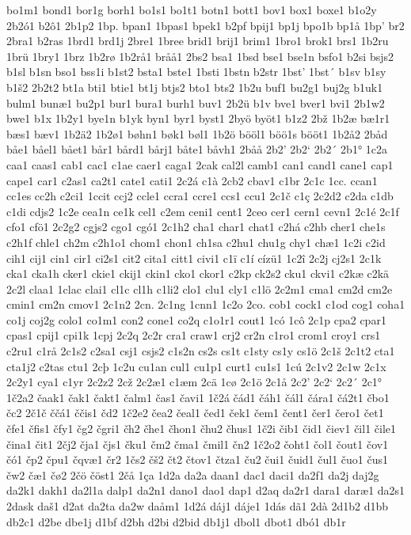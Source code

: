 bo1m1
bond1
bor1g
borh1
bo1s1
bo1t1
botn1
bott1
bov1
box1
boxe1
b1o2y
2b2ó1
b2ô1
2b1p2
1bp.
bpan1
1bpas1
bpek1
b2pf
bpij1
bp1j
bpo1b
bp1å
1bp'
br2
2bra1
b2ras
1brd1
brd1j
2bre1
1bree
brid1
brij1
brim1
1bro1
brok1
brs1
1b2ru
1brü
1bry1
1brz
1b2rø
1b2rå1
bråå1
2bs2
bsa1
1bsd
bse1
bse1n
bsfo1
b2si
bsjs2
b1sl
b1sn
bso1
bss1i
b1st2
bsta1
bste1
1bsti
1bstn
b2str
1bst'
1bst´
b1sv
b1sy
b1š2
2b2t2
bt1a
bti1
btie1
bt1j
btjs2
bto1
bts2
1b2u
buf1
bu2g1
buj2g
b1uk1
bulm1
bunæ1
bu2p1
bur1
bura1
burh1
buv1
2b2ü
b1v
bve1
bver1
bvi1
2b1w2
bwe1
b1x
1b2y1
bye1n
b1yk
byn1
byr1
byst1
2byö
byöt1
b1z2
2bž
1b2æ
bæ1r1
bæs1
bæv1
1b2ä2
1b2ø1
bøhn1
bøk1
bøl1
1b2ö
bööl1
böö1s
bööt1
1b2å2
2båd
båe1
båel1
bået1
bår1
bård1
bårj1
båte1
båvh1
2båå
2b2'
2b2`
2b2´
2b1°
1c2a
caa1
caas1
cab1
cac1
c1ae
caer1
caga1
2cak
cal2l
camb1
can1
cand1
cane1
cap1
cape1
car1
c2as1
ca2t1
cate1
cati1
2c2á
c1à
2cb2
cbav1
c1br
2c1c
1cc.
ccan1
cc1es
cc2h
c2ci1
1ccit
ccj2
ccle1
ccra1
ccre1
ccs1
ccu1
2c1č
c1ç
2c2d2
c2da
c1db
c1di
cdjs2
1c2e
cea1n
ce1k
cel1
c2em
ceni1
cent1
2ceo
cer1
cern1
cevn1
2c1é
2c1f
cfo1
cfö1
2c2g2
cgjs2
cgo1
cgó1
2c1h2
cha1
char1
chat1
c2há
c2hb
cher1
che1s
c2h1f
chle1
ch2m
c2h1o1
chom1
chon1
ch1sa
c2hu1
chu1g
chy1
chæ1
1c2i
c2id
cih1
cij1
cin1
cir1
ci2s1
cit2
cita1
citt1
civi1
c1ï
c1í
cízü1
1c2î
2c2j
cj2s1
2c1k
cka1
cka1h
cker1
ckie1
ckij1
ckin1
cko1
ckor1
c2kp
ck2s2
cku1
ckvi1
c2kæ
c2kä
2c2l
claa1
1clac
clai1
cl1c
cl1h
c1li2
clo1
clu1
cly1
c1lö
2c2m1
cma1
cm2d
cm2e
cmin1
cm2n
cmov1
2c1n2
2cn.
2c1ng
1cnn1
1c2o
2co.
cob1
cock1
c1od
cog1
coha1
co1j
coj2g
colo1
co1m1
con2
cone1
co2q
c1o1r1
cout1
1có
1cô
2c1p
cpa2
cpar1
cpas1
cpij1
cpi1k
1cpj
2c2q
2c2r
cra1
craw1
crj2
cr2n
c1ro1
crom1
croy1
crs1
c2ru1
c1rå
2c1s2
c2sa1
csj1
csjs2
c1s2n
cs2s
cs1t
c1sty
cs1y
cs1ö
2c1š
2c1t2
cta1
cta1j2
c2tas
ctu1
2cþ
1c2u
cu1an
cul1
cu1p1
curt1
cu1s1
1cú
2c1v2
2c1w
2c1x
2c2y1
cya1
c1yr
2c2z2
2cž
2c2æ1
c1æm
2cä
1cø
2c1ö
2c1å
2c2'
2c2`
2c2´
2c1°
1č2a2
čaak1
čak1
čakt1
čalm1
čas1
čavi1
1č2á
čád1
čáh1
čál1
čára1
čá2t1
čbo1
čc2
2č1č
ččá1
ččis1
čd2
1č2e2
čea2
čeal1
čed1
ček1
čem1
čent1
čer1
čero1
čet1
čfe1
čfis1
čfy1
čg2
čgri1
čh2
čhe1
čhon1
čhu2
čhus1
1č2i
čib1
čid1
čiev1
čil1
čile1
čina1
čit1
2čj2
čja1
čjs1
čku1
čm2
čma1
čmil1
čn2
1č2o2
čoht1
čol1
čout1
čov1
čó1
čp2
čpu1
čqvæ1
čr2
1čs2
čš2
čt2
čtov1
čtza1
ču2
čui1
čuid1
čul1
čuo1
čus1
čw2
čæ1
čø2
2čö
čöst1
2čå
1ça
1d2a
da2a
daan1
dac1
daci1
da2f1
da2j
daj2g
da2k1
dakh1
da2l1a
dalp1
da2n1
dano1
dao1
dap1
d2aq
da2r1
dara1
daræ1
da2s1
2dask
daš1
d2at
da2ta
da2w
daåm1
1d2á
dáj1
dáje1
1dás
dã1
2dà
2d1b2
d1bb
db2c1
d2be
dbe1j
d1bf
d2bh
d2bi
d2bid
db1j1
dbol1
dbot1
dbó1
db1r
